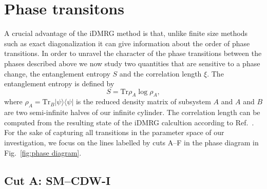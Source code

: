 \documentclass[aps,prx,10pt,twocolumn,floatfix,superscriptaddress,showpacs,numerical,footinbib]{revtex4-1}
\newcommand{\ket}[1]{| #1 \rangle}
\newcommand{\bra}[1]{\langle #1 |}
\begin{document}
\section{\label{sec:phasetransitions} Phase transitons}
%
A crucial advantage of the iDMRG method is that, unlike finite
size methods such as exact diagonalization it can give information about the order of phase transitions.
%
In order to unravel the character of the phase transitions between
the phases described above we now study two quantities that are sensitive
to a phase change, the entanglement entropy $S$ and the correlation length $\xi$.
%
The entanglement entropy is defined by
%
\begin{equation}
 S = \mathrm{Tr} \rho_A \log \rho_A,
\end{equation}
%
where $\rho_A = \mathrm{Tr}_B \ket{\psi}\bra{\psi}$ is the reduced density matrix of subsystem $A$ and $A$ and $B$ are two semi-infinite halves of our infinite cylinder.
%
The correlation length can be computed from the resulting state of the iDMRG calcultion according to Ref.~\cite{KZM13}.
%
For the sake of capturing all transitions in the parameter space of our investigation, we focus on the lines labelled by cuts A--F in the phase diagram in Fig.~\ref{fig:phase diagram}.
%

\subsection{Cut A: SM--CDW-I}
\end{document}
